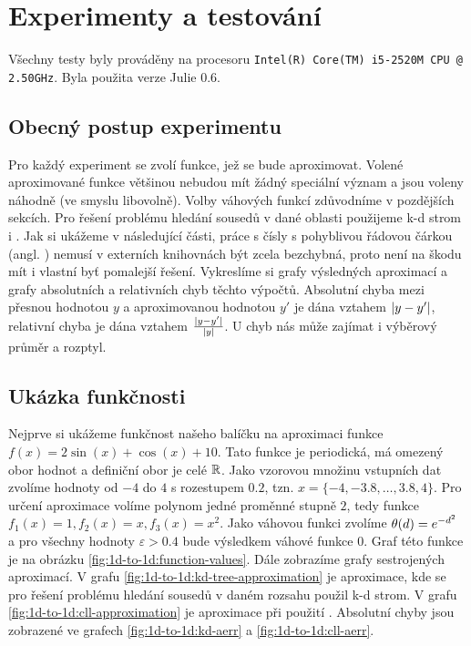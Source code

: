 \chapter{Experimenty a testování}

\newcommand{\insertplot}[1]{\texttt{[image: \#1]}}

Všechny testy byly prováděny na procesoru \texttt{Intel(R) Core(TM) i5-2520M CPU @ 2.50GHz}. Byla použita verze Julie 0.6.

\section{Obecný postup experimentu}

Pro každý experiment se zvolí funkce, jež se bude aproximovat. Volené aproximované funkce většinou nebudou mít žádný speciální význam a jsou voleny náhodně (ve smyslu libovolně). Volby váhových funkcí zdůvodníme v pozdějších sekcích. Pro řešení problému hledání sousedů v dané oblasti použijeme k-d strom i . Jak si ukážeme v následující části, práce s čísly s pohyblivou řádovou čárkou (angl. ) nemusí v externích knihovnách být zcela bezchybná, proto není na škodu mít i vlastní byť pomalejší řešení. Vykreslíme si grafy výsledných aproximací a grafy absolutních a relativních chyb těchto výpočtů. Absolutní chyba mezi přesnou hodnotou $y$ a aproximovanou hodnotou $y'$ je dána vztahem $|y - y'|$, relativní chyba je dána vztahem $\frac{|y - y'|}{|y|}$. U chyb nás může zajímat i výběrový průměr a rozptyl.

\section{Ukázka funkčnosti}

Nejprve si ukážeme funkčnost našeho balíčku na aproximaci funkce $f(x) = 2\sin(x) + \cos(x) + 10$. Tato funkce je periodická, má omezený obor hodnot a definiční obor je celé $\mathbb{R}$. Jako vzorovou množinu vstupních dat zvolíme hodnoty od $-4$ do $4$ s rozestupem $0.2$, tzn. $x = \{-4, -3.8, \ldots, 3.8, 4\}$. Pro určení aproximace volíme polynom jedné proměnné stupně $2$, tedy funkce $f_1(x) = 1, f_2(x) = x, f_3(x) = x^2$. Jako váhovou funkci zvolíme $\theta(d) = e^{-d^2}$ a pro všechny hodnoty $\varepsilon > 0.4$ bude výsledkem váhové funkce $0$. Graf této funkce je na obrázku \ref{fig:1d-to-1d:function-values}. Dále zobrazíme grafy sestrojených aproximací. V grafu \ref{fig:1d-to-1d:kd-tree-approximation} je aproximace, kde se pro řešení problému hledání sousedů v daném rozsahu použil k-d strom. V grafu \ref{fig:1d-to-1d:cll-approximation} je aproximace při použití . Absolutní chyby jsou zobrazené ve grafech \ref{fig:1d-to-1d:kd-aerr} a \ref{fig:1d-to-1d:cll-aerr}.

